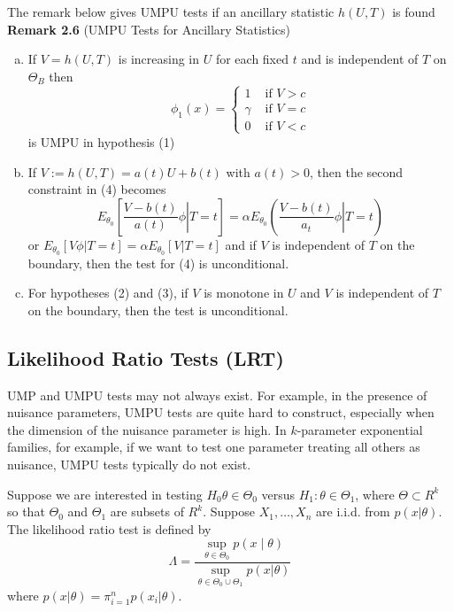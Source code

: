 \documentclass[12pt]{article}
\numberwithin{equation}{section}
\begin{document}
\newpage
The remark below gives UMPU tests if an ancillary statistic $h(U, T)$ is found
\textbf{Remark 2.6} (UMPU Tests for Ancillary Statistics) \\
\begin{enumerate}[(a)]
  \item If $V = h(U, T)$ is increasing in $U$ for each fixed $t$ and is independent of $T$ on $\Theta_B$ then
  \begin{equation*}
  \phi_1(x) = 
  \begin{cases}
    1          &\text{ if } V > c \\
    \gamma     &\text{ if } V = c \\
    0          &\text{ if } V < c
  \end{cases}
  \end{equation*}
  is UMPU in hypothesis (1)
  \item If $V := h(U, T) = a(t)U + b(t)$ with $a(t) > 0$, then the second constraint in (4) becomes
  \begin{equation*}
    E_{\theta_0} \left[ \left. \frac{V - b(t)}{a(t)} \phi \right\rvert T = t \right] 
    = \alpha E_{\theta_0} \left( \left. \frac{V - b(t)}{a_t} \phi \right\rvert T = t \right)
  \end{equation*}
  or $E_{\theta_0}[V \phi | T = t] = \alpha E_{\theta_0}[V|T = t]$ and if $V$ is independent of $T$ on the boundary, then the test for (4) is unconditional.
  \item For hypotheses (2) and (3), if $V$ is monotone in $U$ and $V$ is independent of $T$ on the boundary, then the test is unconditional.
\end{enumerate}



\subsection{Likelihood Ratio Tests (LRT)}
UMP and UMPU tests may not always exist. For example, in the presence of
nuisance parameters, UMPU tests are quite hard to construct, especially
when the dimension of the nuisance parameter is high. In $k$-parameter
exponential families, for example, if we want to test one parameter treating all others as nuisance, UMPU tests typically do not exist.

Suppose we are interested in testing $H_0 \theta \in \Theta_0$ versus 
$H_1 : \theta \in \Theta_1$, where $\Theta \subset R^k$ so that $\Theta_0$ and $\Theta_1$ are subsets of $R^k$. Suppose $X_1, \ldots, X_n$ are i.i.d. from $p(x | \theta)$. The likelihood ratio test is defined by
%
\begin{equation*}
  \Lambda = \frac{\sup_{\theta \in \Theta_0} p(x \mid \theta)}
  {\sup_{\theta \in \Theta_0 \cup \Theta_1} p(x | \theta)}
\end{equation*}
where $p(x | \theta) = \pi_{i=1}^n p(x_i | \theta)$. 
\end{document}
